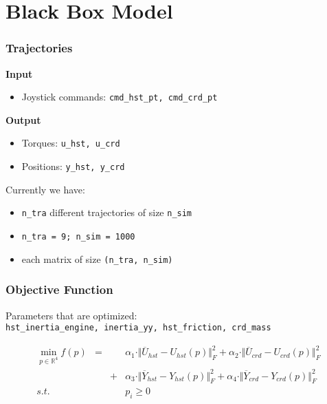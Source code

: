 \documentclass{beamer}
\begin{document}
\section{Black Box Model}

\begin{frame}
	\frametitle{Trajectories}
	
	\textbf{Input}
	\begin{itemize}
		\item{Joystick commands: \lstinline{cmd_hst_pt, cmd_crd_pt}}
	\end{itemize}
	
	\vspace{0.5cm}
	
	\textbf{Output}
	\begin{itemize}
		\item{Torques: \lstinline{u_hst, u_crd}}
		\item{Positions: \lstinline{y_hst, y_crd}}
	\end{itemize}

	\vspace{0.5cm}

	Currently we have:
	\begin{itemize}
		\item{\lstinline{n_tra} different trajectories of size \lstinline{n_sim}}
		\item{\lstinline{n_tra = 9; n_sim = 1000}}
		\item{each matrix of size \lstinline{(n_tra, n_sim)}}	
	\end{itemize}
\end{frame}

\begin{frame}
	\frametitle{Objective Function}
	Parameters that are optimized: \\
	\lstinline{hst_inertia_engine, inertia_yy, hst_friction, crd_mass}
	
	\vspace{0.5cm}
	\begin{align*}
		\min_{p\in\mathbb{R}^4} f(p)& = &	 & \alpha_1\cdot \Vert \overline{U}_{hst} - U_{hst}\left(p\right) \Vert_{F}^2
		+ \alpha_2\cdot \Vert \overline{U}_{crd} - U_{crd}\left(p\right) \Vert_{F}^2 \\
		& & + & \alpha_3\cdot \Vert \overline{Y}_{hst} - Y_{hst}\left(p\right) \Vert_{F}^2
		+ \alpha_4\cdot \Vert \overline{Y}_{crd} - Y_{crd}\left(p\right) \Vert_{F}^2 \\
		s.t.& & & p_i \geq 0
	\end{align*}
\end{frame}
\end{document}

